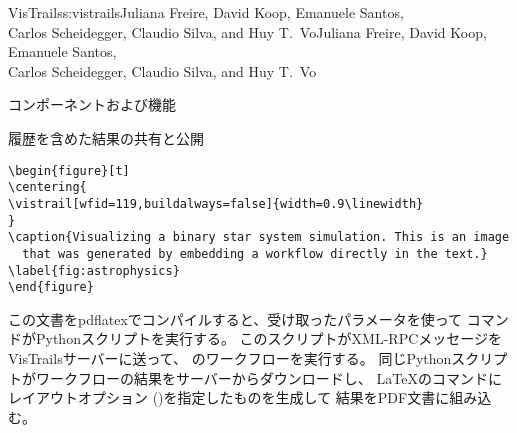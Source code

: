 \begin{aosachaptertoc}{VisTrails}{s:vistrails}{Juliana Freire, David Koop, Emanuele Santos, \\ Carlos Scheidegger, Claudio Silva, and Huy T.\ Vo}{Juliana Freire, David Koop, Emanuele Santos, \\ \hspace*{0.9cm} Carlos Scheidegger, Claudio Silva, and Huy T.\ Vo}
\begin{aosasect1}{コンポーネントおよび機能}
\begin{aosasect2}{履歴を含めた結果の共有と公開}
\begin{verbatim}
\begin{figure}[t]
\centering{
\vistrail[wfid=119,buildalways=false]{width=0.9\linewidth}
}
\caption{Visualizing a binary star system simulation. This is an image
  that was generated by embedding a workflow directly in the text.}
\label{fig:astrophysics}
\end{figure}
\end{verbatim}

この文書をpdflatexでコンパイルすると、受け取ったパラメータを使って
コマンドがPythonスクリプトを実行する。
このスクリプトがXML-RPCメッセージをVisTrailsサーバーに送って、
のワークフローを実行する。
同じPythonスクリプトがワークフローの結果をサーバーからダウンロードし、
LaTeXのコマンドにレイアウトオプション
()を指定したものを生成して
結果をPDF文書に組み込む。


\end{aosasect2}
\end{aosasect1}
\end{aosachaptertoc}
